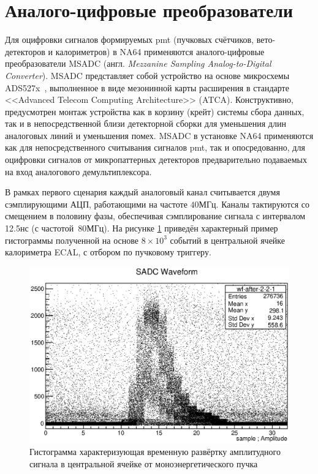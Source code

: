 \section{Аналого-цифровые преобразователи}

Для оцифровки сигналов формируемых \acrshort{pmt} (пучковых счётчиков,
вето-детекторов и калориметров) в NA64 применяются
аналого-цифровые преобразователи MSADC \cite{MSADC-Mann1, MSADC-Mann2}
(англ. \emph{Mezzanine Sampling Analog-to-Digital Converter}).
MSADC представляет собой устройство на основе микросхемы
ADS527x~\cite{ADS527x}, выполненное в виде мезонинной карты расширения
в стандарте <<Advanced Telecom Computing Architecture>> (ATCA).
Конструктивно, предусмотрен монтаж устройства как в
корзину (крейт) системы сбора данных, так и в непосредственной близи
детекторной сборки для уменьшения длин аналоговых линий и уменьшения помех.
MSADC в установке NA64 применяются как для непосредственного считывания
сигналов \acrshort{pmt}, так и опосредованно, для оцифровки сигналов
от микропаттерных детекторов предварительно подаваемых на вход
аналогового демультиплексора.

В рамках первого сценария каждый аналоговый канал считывается двумя сэмплирующими
АЦП, работающими на частоте $40\text{МГц}$. Каналы тактируются со
смещением в половину
фазы, обеспечивая сэмплирование сигнала с интервалом 12.5нс (с
частотой~$80\text{МГц}$). На рисунке \ref{fig:msadc-example} приведён
характерный пример гистограммы полученной на основе $8\times10^3$ событий в
центральной ячейке калориметра ECAL, с отбором по пучковому триггеру.

\begin{figure}
    \centering
    \includegraphics[width=0.65\linewidth]{images/illustrative/msadc-waveforms-example.eps}
    \caption{Гистограмма характеризующая временную развёртку амплитудного сигнала в
    центральной ячейке от моноэнергетического пучка}
    \label{fig:msadc-example}
\end{figure}

